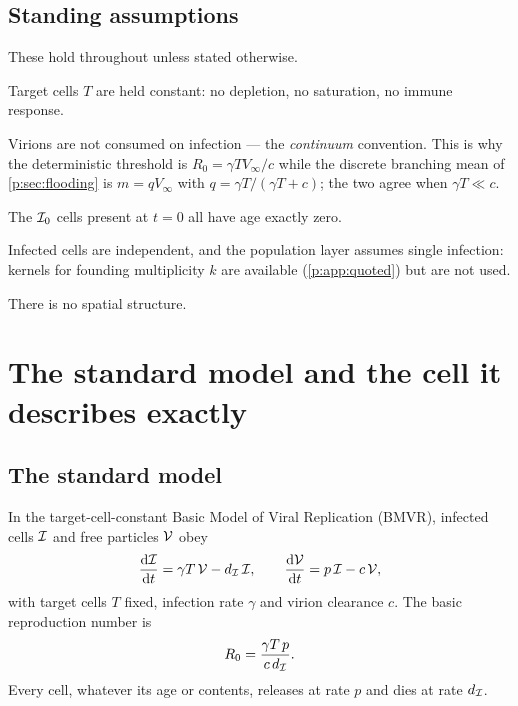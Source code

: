 \subsection{Standing assumptions}
\label{p:sec:assumptions}

These hold throughout unless stated otherwise.

\begin{description}[leftmargin=2.2em,style=sameline]
\item[(A1)] Target cells $T$ are held constant: no depletion, no
saturation, no immune response.
\item[(A2)] Virions are not consumed on infection --- the \emph{continuum}
convention. This is why the deterministic threshold is
$R_0=\gamma TV_\infty/c$ while the discrete branching mean of
\cref{p:sec:flooding} is $m=qV_\infty$ with $q=\gamma T/(\gamma T+c)$; the
two agree when $\gamma T\ll c$.
\item[(A3)] The $\mathcal{I}_0$ cells present at $t=0$ all have age exactly
zero.
\item[(A4)] Infected cells are independent, and the population layer
assumes single infection: kernels for founding multiplicity $k$ are
available (\cref{p:app:quoted}) but are not used.
\item[(A5)] There is no spatial structure.
\end{description}

\FloatBarrier

\section{The standard model and the cell it describes exactly}
\label{p:sec:comparator}

\subsection{The standard model}
\label{p:sec:classical}

In the target-cell-constant Basic Model of Viral Replication (BMVR),
infected cells $\mathcal{I}$ and free particles $\mathcal{V}$ obey
\begin{equation}
\frac{\mathrm{d} \mathcal{I}}{\mathrm{d} t} = \gamma T\,\mathcal{V} - d_{\mathcal{I}}\,\mathcal{I},
\qquad
\frac{\mathrm{d} \mathcal{V}}{\mathrm{d} t} = p\,\mathcal{I} - c\,\mathcal{V},
\label{p:eq:bmvr-classical}
\end{equation}
with target cells $T$ fixed, infection rate $\gamma$ and virion clearance
$c$. The basic reproduction number is
\begin{equation}
R_0=\frac{\gamma T\,p}{c\,d_{\mathcal{I}}}.
\label{p:eq:R0classical}
\end{equation}
Every cell, whatever its age or contents, releases at rate $p$ and dies at
rate $d_{\mathcal{I}}$.

